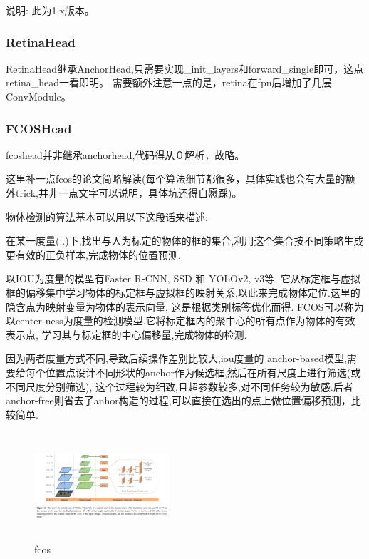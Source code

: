 \documentclass[UTF8]{ctexart}
\begin{document}
说明: 此为1.x版本。

\subsubsection{RetinaHead}
RetinaHead继承AnchorHead,只需要实现\_init\_layers和forward\_single即可，这点retina\_head一看即明。
需要额外注意一点的是，retina在fpn后增加了几层ConvModule。

\subsubsection{FCOSHead}
\label{sub:FCOSHead}
fcoshead并非继承anchorhead,代码得从０解析，故略。

这里补一点fcos的论文简略解读(每个算法细节都很多，具体实践也会有大量的额外trick,并非一点文字可以说明，具体坑还得自愿踩)。

物体检测的算法基本可以用以下这段话来描述:

在某一度量(..)下,找出与人为标定的物体的框的集合,利用这个集合按不同策略生成更有效的正负样本,完成物体的位置预测.

以IOU为度量的模型有Faster R-CNN, SSD 和 YOLOv2, v3等.
它从标定框与虚拟框的偏移集中学习物体的标定框与虚拟框的映射关系,以此来完成物体定位.这里的隐含点为映射变量为物体的表示向量,
这是根据类别标签优化而得. FCOS可以称为以center-ness为度量的检测模型.它将标定框内的聚中心的所有点作为物体的有效表示点,
学习其与标定框的中心偏移量,完成物体的检测.

因为两者度量方式不同,导致后续操作差别比较大,iou度量的
anchor-based模型,需要给每个位置点设计不同形状的anchor作为候选框,然后在所有尺度上进行筛选(或不同尺度分别筛选),
这个过程较为细致,且超参数较多,对不同任务较为敏感.后者anchor-free则省去了anhor构造的过程,可以直接在选出的点上做位置偏移预测，比较简单.


\begin{figure}[htbp]
	\centering
	\begin{minipage}[t]{0.9\textwidth}
	\centering
	\includegraphics[width=5cm, height=4cm]{./pic/fcos_struct.png}
	\caption{fcos}
	\label{picfcos}
	\end{minipage}
\end{figure}
\end{document}
